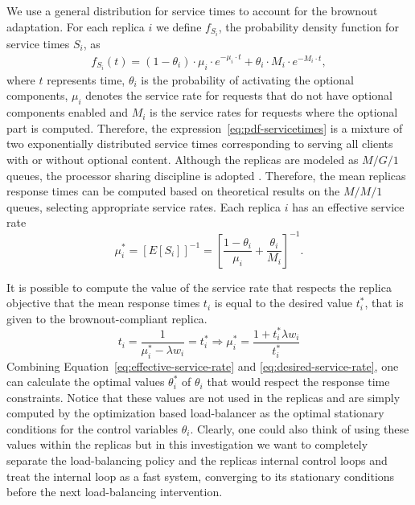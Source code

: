 We use a general distribution for service times to account for the
brownout adaptation. For each replica $i$ we define $f_{S_i}$, the
probability density function for service times $S_i$, as
\begin{align}
  f_{S_i} (t) = (1 - \theta_i) \cdot \mu_i \cdot e^{-\mu_i \cdot t} +
  \theta_i \cdot M_i \cdot e^{-M_i \cdot t} ,
\label{eq:pdf-servicetimes}
\end{align}
where $t$ represents time, $\theta_i$ is the probability of activating
the optional components, $\mu_i$ denotes the service rate for requests
that do not have optional components enabled and $M_i$ is the service
rates for requests where the optional part is computed. Therefore, the
expression~\eqref{eq:pdf-servicetimes} is a mixture of two
exponentially distributed service times corresponding to serving all
clients with or without optional content. Although the replicas are
modeled as $M/G/1$ queues, the processor sharing discipline is adopted
. Therefore, the mean replicas response times can
be computed based on theoretical results on the $M/M/1$ queues,
selecting appropriate service rates. Each replica $i$ has an effective
service rate
\begin{equation}
  \mu_i^* = \left[ E[S_i] \right]^{-1} = \left[ \frac{1-\theta_i}{\mu_i}
    + \frac{\theta_i}{M_i} \right]^{-1} .
  \label{eq:effective-service-rate}
\end{equation}

It is possible to compute the value of the service rate that respects
the replica objective that the mean response times $t_i$ is equal to
the desired value $t_i^*$, that is given to the brownout-compliant
replica.
\begin{equation}
  t_i = \frac{1}{\mu_i^*-\lambda w_i} = t_i^*
  \Longrightarrow \mu_i^* = \frac{1+t_i^*\lambda w_i}{t_i^*} 
  \label{eq:desired-service-rate}
\end{equation}
Combining Equation~\eqref{eq:effective-service-rate} and
\eqref{eq:desired-service-rate}, one can calculate the optimal values
$\theta_i^*$ of $\theta_i$ that would respect the response time
constraints.  Notice that these values are not used in the replicas
and are simply computed by the optimization based load-balancer as the
optimal stationary conditions for the control variables
$\theta_i$. Clearly, one could also think of using these values within
the replicas but in this investigation we want to completely separate
the load-balancing policy and the replicas internal control loops and
treat the internal loop as a fast system, converging to its stationary
conditions before the next load-balancing intervention.

